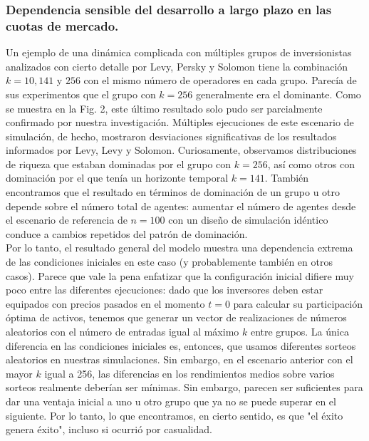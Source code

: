 \documentclass[12pt,a4paper]{article}
\begin{document}
\subsubsection*{Dependencia sensible del desarrollo a largo plazo en las cuotas de mercado.}
\quad Un ejemplo de una dinámica complicada con múltiples grupos de inversionistas analizados con cierto detalle por Levy, Persky y Solomon tiene la combinación $k = 10, 141$ y $256$ con el mismo número de operadores en cada grupo. Parecía de sus experimentos que el grupo con $k = 256$ generalmente era el dominante. Como se muestra en la Fig. 2, este último resultado solo pudo ser parcialmente confirmado por nuestra investigación. Múltiples ejecuciones de este escenario de simulación, de hecho, mostraron desviaciones significativas de los resultados informados por Levy, Levy y Solomon. Curiosamente, observamos distribuciones de riqueza que estaban dominadas por el grupo con $k = 256$, así como otros con dominación por el que tenía un horizonte temporal $k = 141$. También encontramos que el resultado en términos de dominación de un grupo u otro depende sobre el número total de agentes: aumentar el número de agentes desde el escenario de referencia de $n = 100$ con un diseño de simulación idéntico conduce a cambios repetidos del patrón de dominación.\\
\quad Por lo tanto, el resultado general del modelo muestra una dependencia extrema de las condiciones iniciales en este caso (y probablemente también en otros casos). Parece que vale la pena enfatizar que la configuración inicial difiere muy poco entre las diferentes ejecuciones: dado que los inversores deben estar equipados con precios pasados en el momento $ t = 0 $ para calcular su participación óptima de activos, tenemos que generar un vector de realizaciones de números aleatorios con el número de entradas igual al máximo $ k $ entre grupos. La única diferencia en las condiciones iniciales es, entonces, que usamos diferentes sorteos aleatorios en nuestras simulaciones. Sin embargo, en el escenario anterior con el mayor $ k $ igual a 256, las diferencias en los rendimientos medios sobre varios sorteos realmente deberían ser mínimas. Sin embargo, parecen ser suficientes para dar una ventaja inicial a uno u otro grupo que ya no se puede superar en el siguiente. Por lo tanto, lo que encontramos, en cierto sentido, es que "el éxito genera éxito", incluso si ocurrió por casualidad.
\end{document}
